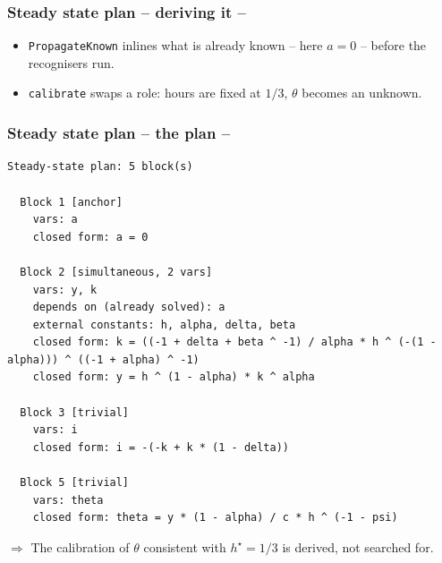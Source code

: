 \documentclass[10pt,slidestop]{beamer}
\theoremstyle{plain}
\begin{document}
\begin{frame}[c,fragile]
  \frametitle{Steady state plan -- deriving it --}

  

  \medskip

  \begin{itemize}

  \item \verb+PropagateKnown+ inlines what is already known -- here $a=0$ --
    before the recognisers run.\newline

  \item \verb+calibrate+ swaps a role: hours are fixed at $1/3$, $\theta$
    becomes an unknown.

  \end{itemize}

\end{frame}


\begin{frame}[c,fragile]
  \frametitle{Steady state plan -- the plan --}

  \begin{lstlisting}[style=MatlabConsole,basicstyle=\ttfamily\scriptsize]
Steady-state plan: 5 block(s)

  Block 1 [anchor]
    vars: a
    closed form: a = 0

  Block 2 [simultaneous, 2 vars]
    vars: y, k
    depends on (already solved): a
    external constants: h, alpha, delta, beta
    closed form: k = ((-1 + delta + beta ^ -1) / alpha * h ^ (-(1 - alpha))) ^ ((-1 + alpha) ^ -1)
    closed form: y = h ^ (1 - alpha) * k ^ alpha

  Block 3 [trivial]
    vars: i
    closed form: i = -(-k + k * (1 - delta))

  Block 5 [trivial]
    vars: theta
    closed form: theta = y * (1 - alpha) / c * h ^ (-1 - psi)
  \end{lstlisting}

  $\Rightarrow$ The calibration of $\theta$ consistent with $h^{\star}=1/3$ is
  derived, not searched for.

\end{frame}
\end{document}
